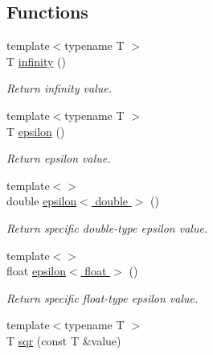 \subsection*{Functions}
\begin{DoxyCompactItemize}
\item 
\mbox{\label{namespaceddd_ad85f2129847410744f5a20fe364c11b1}} 
{\footnotesize template$<$typename T $>$ }\\T \hyperlink{namespaceddd_ad85f2129847410744f5a20fe364c11b1}{infinity} ()
\begin{DoxyCompactList}\small\item\em Return infinity value. \end{DoxyCompactList}\item 
\mbox{\label{namespaceddd_ab55dae45d0811c0c1bf70ac26ddd9a31}} 
{\footnotesize template$<$typename T $>$ }\\T \hyperlink{namespaceddd_ab55dae45d0811c0c1bf70ac26ddd9a31}{epsilon} ()
\begin{DoxyCompactList}\small\item\em Return epsilon value. \end{DoxyCompactList}\item 
\mbox{\label{namespaceddd_a1a221e63a5d10669dcd87178911cdac5}} 
{\footnotesize template$<$$>$ }\\double \hyperlink{namespaceddd_a1a221e63a5d10669dcd87178911cdac5}{epsilon$<$ double $>$} ()
\begin{DoxyCompactList}\small\item\em Return specific double-\/type epsilon value. \end{DoxyCompactList}\item 
\mbox{\label{namespaceddd_a19135a4582ea8e38ebb186e9dfd75eb8}} 
{\footnotesize template$<$$>$ }\\float \hyperlink{namespaceddd_a19135a4582ea8e38ebb186e9dfd75eb8}{epsilon$<$ float $>$} ()
\begin{DoxyCompactList}\small\item\em Return specific float-\/type epsilon value. \end{DoxyCompactList}\item 
{\footnotesize template$<$typename T $>$ }\\T \hyperlink{namespaceddd_a1d4703ab7fa9c58943ff44b368dacb4b}{sqr} (const T \&value)

\end{DoxyCompactItemize}
